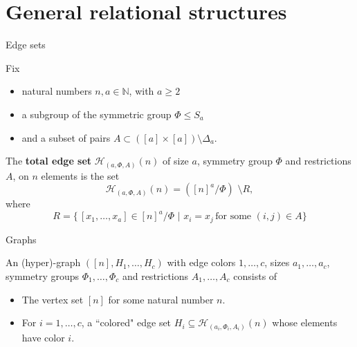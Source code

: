 \documentclass[handout, 11pt]{beamer}
\newcommand{\N}{\mathbb{N}}
\begin{document}
	\section{General relational structures}
	\begin{frame}{Edge sets}
		\begin{definition} Fix
			\begin{itemize}
				\item natural numbers $n,a\in \N$, with $a\geq 2$
				\item a subgroup of the symmetric group $\Phi \leq S_a$
				\item and a subset of pairs $A\subset ([a]\times [a]) \setminus \Delta_a$.
			\end{itemize}
		The \textbf{total edge set} $\mathcal{H}_{(a,\Phi, A)}(n)$ of size $a$, 
		symmetry group $\Phi$ and
		restrictions $A$, on $n$ elements is the set
		\[ \mathcal{H}_{(a,\Phi, A)}(n)= ([n]^a/\Phi) \, \,
		\setminus R, \]
		where
		\[ R = \{\,  [x_1, \dots,x_a] \in [n]^a/\Phi  \, \, 
		| \, \, x_i=x_j \, \text{for some } (i,j)\in A \} \] 
		\end{definition}
	\end{frame}
	\begin{frame}{Graphs}
		\begin{definition}
			An (hyper)-graph $([n], H_1,\dots, H_c)$ with edge colors 
			$1,\dots, c$, sizes $a_1,\dots,a_c$, 
			symmetry groups $\Phi_1,\dots,\Phi_c$ and 
			restrictions $A_1,\dots,A_c$ consists of 
			\begin{itemize}
				\item The vertex set $[n]$ for some natural number $n$.
				\item For $i=1,\dots,c$, a ``colored" edge set $H_i\subseteq \mathcal{H}_{(a_i,\Phi_i,A_i)}(n)$ whose elements 
				have color $i$.
			\end{itemize}
		\end{definition}
	\end{frame}
	 
\end{document}
